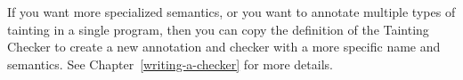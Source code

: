 If you want more specialized semantics, or you want to annotate multiple
types of tainting in a single program, then you can copy the definition of
the Tainting Checker to create a new annotation and checker with a more
specific name and semantics.  See Chapter~\ref{writing-a-checker} for more
details.


